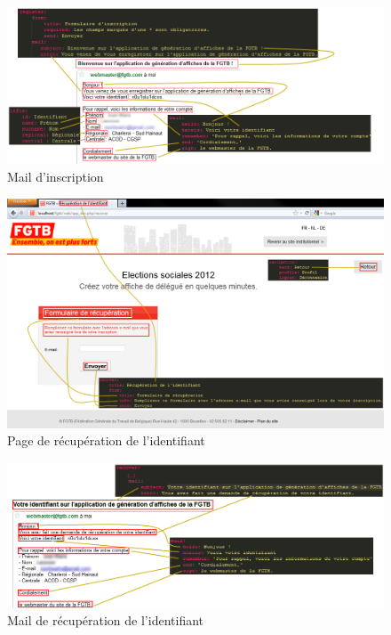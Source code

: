 \documentclass{article}
\begin{document}
\begin{sffamily}
\begin{figure}[!h]
\includegraphics[width=\textwidth]{messages_registermail.png}
\caption{Mail d'inscription}
\end{figure}

\begin{figure}[!h]
\includegraphics[width=\textwidth]{messages_recoverpage.png}
\caption{Page de récupération de l'identifiant}
\end{figure}

\begin{figure}[!h]
\includegraphics[width=\textwidth]{messages_recovermail.png}
\caption{Mail de récupération de l'identifiant}
\end{figure}


\end{sffamily}
\end{document}
